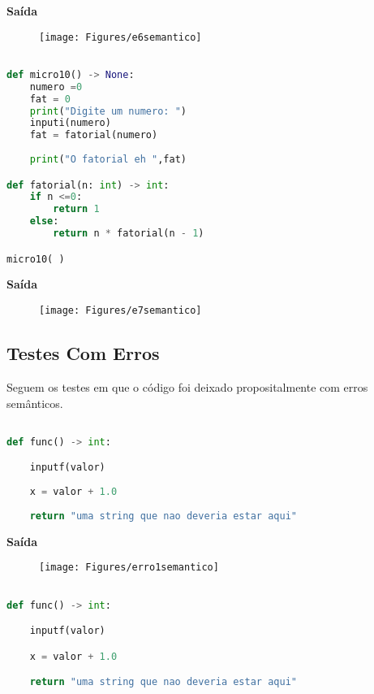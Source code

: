 \documentclass[hidelinks,12pt]{article}
\begin{document}
\textbf{{\large Saída}}

\begin{figure}[!h]
	\centering
	\texttt{[image: Figures/e6semantico]}
\end{figure}


\begin{lstlisting}[caption=sintatico.mli, language=python]

def micro10() -> None:
	numero =0
	fat = 0
	print("Digite um numero: ")
	inputi(numero)
	fat = fatorial(numero)
	
	print("O fatorial eh ",fat)

def fatorial(n: int) -> int:
	if n <=0:
		return 1
	else:
		return n * fatorial(n - 1)

micro10( )

\end{lstlisting}

\textbf{{\large Saída}}

\begin{figure}[!h]
	\centering
	\texttt{[image: Figures/e7semantico]}
\end{figure}



\subsection{Testes Com Erros}


Seguem os testes em que o código foi deixado propositalmente com erros semânticos.


\begin{lstlisting}[caption=sintatico.mli, language=python]

def func() -> int:

	inputf(valor)
	
	x = valor + 1.0
	
	return "uma string que nao deveria estar aqui"

\end{lstlisting}


\textbf{{\large Saída}}

\begin{figure}[!h]
	\centering
	\texttt{[image: Figures/erro1semantico]}
\end{figure}	
	
	
	
\begin{lstlisting}[caption=sintatico.mli, language=python]

def func() -> int:

	inputf(valor)

	x = valor + 1.0

	return "uma string que nao deveria estar aqui"

\end{lstlisting}
\end{document}
